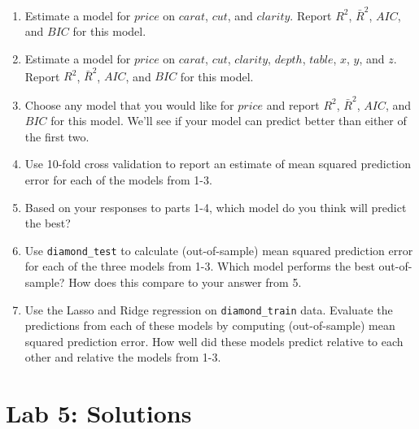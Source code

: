\documentclass[
  letterpaper,
  DIV=11,
  numbers=noendperiod]{scrreprt}
\begin{document}
\begin{enumerate}
\def\labelenumi{\arabic{enumi}.}
\item
  Estimate a model for \(price\) on \(carat\), \(cut\), and \(clarity\).
  Report \(R^2\), \(\bar{R}^2\), \(AIC\), and \(BIC\) for this model.
\item
  Estimate a model for \(price\) on \(carat\), \(cut\), \(clarity\),
  \(depth\), \(table\), \(x\), \(y\), and \(z\). Report \(R^2\),
  \(\bar{R}^2\), \(AIC\), and \(BIC\) for this model.
\item
  Choose any model that you would like for \(price\) and report \(R^2\),
  \(\bar{R}^2\), \(AIC\), and \(BIC\) for this model. We'll see if your
  model can predict better than either of the first two.
\item
  Use 10-fold cross validation to report an estimate of mean squared
  prediction error for each of the models from 1-3.
\item
  Based on your responses to parts 1-4, which model do you think will
  predict the best?
\item
  Use \texttt{diamond\_test} to calculate (out-of-sample) mean squared
  prediction error for each of the three models from 1-3. Which model
  performs the best out-of-sample? How does this compare to your answer
  from 5.
\item
  Use the Lasso and Ridge regression on \texttt{diamond\_train} data.
  Evaluate the predictions from each of these models by computing
  (out-of-sample) mean squared prediction error. How well did these
  models predict relative to each other and relative the models from
  1-3.
\end{enumerate}

\section{Lab 5: Solutions}\label{lab-5-solutions}
\end{document}
